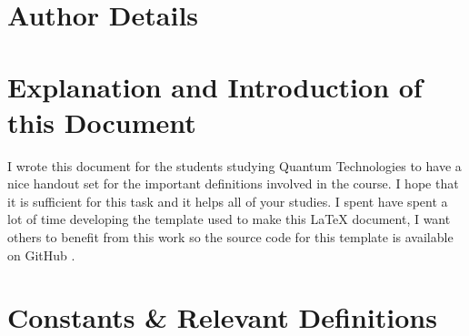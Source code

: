 \documentclass[colorlinks,11pt,a4paper,normalphoto,withhyper,ragged2e]{altareport}
\begin{document}
\MakeReportTitlePage


\setcounter{page}{1}





\section*{Author Details}
\makeauthordetails

\setcounter{tocdepth}{2} 
\tableofcontents %





\section*{Explanation and Introduction of this Document}
I wrote this document for the students studying Quantum Technologies to have a nice handout set for the important definitions involved in the course. I hope that it is sufficient for this task and it helps all of your studies. \linebreak
I spent have spent a lot of time developing the template used to make this {\LaTeX} document, I want others to benefit from this work so the source code for this template is available on GitHub \cite{latex_template_github}.
\newpage
{} %


	\section{Constants \& Relevant Definitions}
		
\end{document}

